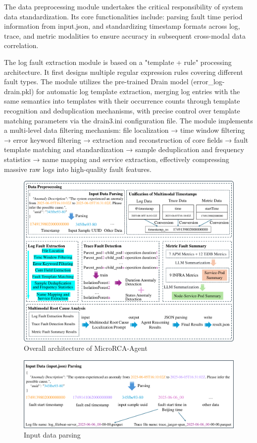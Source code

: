 \documentclass[10pt]{article}
\begin{document}
The data preprocessing module undertakes the critical responsibility of system data standardization. Its core functionalities include: parsing fault time period information from input.json, and standardizing timestamp formats across log, trace, and metric modalities to ensure accuracy in subsequent cross-modal data correlation.

The log fault extraction module is based on a "template + rule" processing architecture. It first designs multiple regular expression rules covering different fault types. The module utilizes the pre-trained Drain model\cite{he2017drain} (error\_log-drain.pkl) for automatic log template extraction, merging log entries with the same semantics into templates with their occurrence counts through template recognition and deduplication mechanisms, with precise control over template matching parameters via the drain3.ini configuration file. The module implements a multi-level data filtering mechanism: file localization → time window filtering → error keyword filtering → extraction and reconstruction of core fields → fault template matching and standardization → sample deduplication and frequency statistics → name mapping and service extraction, effectively compressing massive raw logs into high-quality fault features.

\begin{figure}[t]
    \centering
    \includegraphics[width=0.95\linewidth]{pics/fig1.pdf}
    \caption{Overall architecture of MicroRCA-Agent}
    \label{fig1}
\end{figure}

\begin{figure}[htbp]
    \centering
    \includegraphics[width=0.95\linewidth]{pics/fig2.pdf}
    \caption{Input data parsing}
    \label{fig2}
\end{figure}
\end{document}
